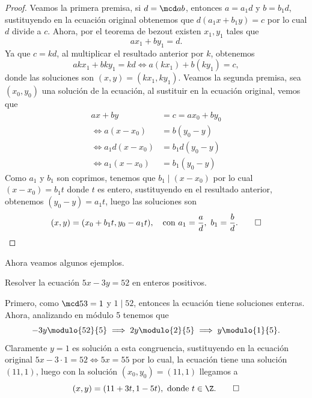 \documentclass[12pt]{article}
\begin{document}
    \begin{proof}
        Veamos la primera premisa, si $d = \mcd a b$, entonces $a = a_1 d$ y $b = b_1 d$, sustituyendo en la ecuación original
        obtenemos que $d (a_1 x + b_1 y) = c$ por lo cual $d$ divide a $c$.
        Ahora, por el teorema de bezout existen $x_1, y_1$ tales que
        \[
            ax_1 + by_1 = d.
        \]
        Ya que $c = kd$, al multiplicar el resultado anterior por $k$, obtenemos
        \[
            a k x_1 + b k y_1 = kd \iff a (kx_1) + b (ky_1) = c,
        \]
        donde las soluciones son $(x,y) = (kx_1, ky_1)$.
        Veamos la segunda premisa, sea $(x_0, y_0)$ una solución de la ecuación, al sustituir en la ecuación original, vemos que
        \begin{align*}
            ax + by &= c = ax_0 + by_0 \\
            \iff a(x - x_0) &= b (y_0 - y) \\
            \iff a_1 d(x - x_0) &= b_1 d (y_0 - y) \\
            \iff a_1 (x - x_0) &= b_1 (y_0 - y)
        \end{align*}
        Como $a_1$ y $b_1$ son coprimos, tenemos que $b_1 \mid (x - x_0)$ por lo cual $(x - x_0) = b_1 t$ donde $t$ es entero,
        sustituyendo en el resultado anterior, obtenemos $(y_0 - y) = a_1 t$, luego las soluciones son
        \[
            (x,y) = (x_0 + b_1 t, y_0 - a_1 t),\quad\text{con}\ a_1 = \frac{a}{d}, \ b_1 = \frac{b}{d}.\qedhere
        \]
    \end{proof}

    Ahora veamos algunos ejemplos.

    \begin{example}
        Resolver la ecuación $5x - 3y = 52$ en enteros positivos.
    \end{example}
    \begin{solution}
        Primero, como $\mcd 5 3 = 1$ y $1 \mid 52$, entonces la ecuación tiene soluciones enteras.
        Ahora, analizando en módulo 5 tenemos que
        \[
            - 3y \modulo{52}{5} \implies 2y \modulo{2}{5} \implies y \modulo{1}{5}.
        \]
        Claramente $y = 1$ es solución a esta congruencia, sustituyendo en la ecuación original $5x - 3\cdot 1 = 52 \iff 5x = 55$
        por lo cual, la ecuación tiene una solución $(11, 1)$, luego con la solución $(x_0,y_0)=(11,1)$ llegamos a
        \[
            (x,y) = (11+3t,1-5t),\ \text{donde}\ t\in \Z.\qedhere
        \]
    \end{solution}
\end{document}
